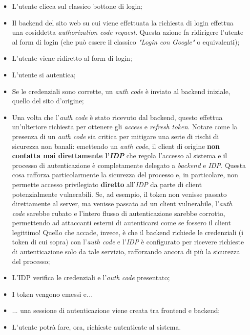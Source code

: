 \begin{itemize}
    \item L'utente clicca sul classico bottone di login;
    \item Il backend del sito web su cui viene effettuata la richiesta di login effettua una cosiddetta \textit{authorization code request}. Questa azione fa ridirigere l'utente al form di login (che può essere il classico \textit{"Login con Google"} o equivalenti);
    \item L'utente viene ridiretto al form di login;
    \item L'utente si autentica;
    \item Se le credenziali sono corrette, un \textit{auth code} è inviato al backend iniziale, quello del sito d'origine;
    \item Una volta che l'\textit{auth code} è stato ricevuto dal backend, questo effettua un'ulteriore richiesta per ottenere gli \textit{access} e \textit{refresh token}. Notare come la presenza di un \textit{auth code} sia critica per mitigare una serie di rischi di sicurezza non banali: emettendo un \textit{auth code}, il client di origine \textbf{non contatta mai direttamente l'\textit{IDP}} che regola l'accesso al sistema e il processo di autenticazione è completamente delegato a \textit{backend} e \textit{IDP}. Questa cosa rafforza particolarmente la sicurezza del processo e, in particolare, non permette accesso privilegiato \textbf{diretto} all'\textit{IDP} da parte di client potenzialmente vulnerabili. Se, ad esempio, il token non venisse passato direttamente al server, ma venisse passato ad un client vulnerabile, l'\textit{auth code} sarebbe rubato e l'intero flusso di autenticazione sarebbe corrotto, permettendo ad attaccanti esterni di autenticarsi come se fossero il client legittimo! Quello che accade, invece, è che il backend richiede le credenziali (i token di cui sopra) con l'\textit{auth code} e l'\textit{IDP} è configurato per ricevere richieste di autenticazione solo da tale servizio, rafforzando ancora di più la sicurezza del processo;
    \item L'IDP verifica le credenziali e l'\textit{auth code} presentato;
    \item I token vengono emessi e...
    \item ... una sessione di autenticazione viene creata tra frontend e backend;
    \item L'utente potrà fare, ora, richieste autenticate al sistema.
\end{itemize}
\newpage
